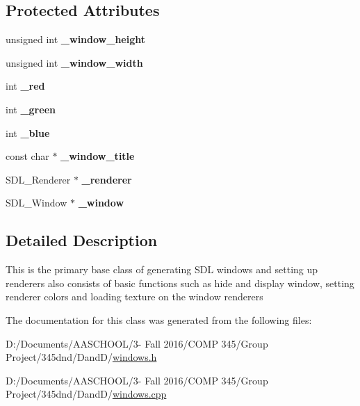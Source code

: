 \subsection*{Protected Attributes}
\begin{DoxyCompactItemize}
\item 
\hypertarget{class_s_d_l_window_acc157932676ffcb867e6a310d0dbf69b}{}\label{class_s_d_l_window_acc157932676ffcb867e6a310d0dbf69b} 
unsigned int {\bfseries \+\_\+window\+\_\+height}
\item 
\hypertarget{class_s_d_l_window_acd0639d5ba847c6fdffa9670678e0b4f}{}\label{class_s_d_l_window_acd0639d5ba847c6fdffa9670678e0b4f} 
unsigned int {\bfseries \+\_\+window\+\_\+width}
\item 
\hypertarget{class_s_d_l_window_a56b01157b3545f359a0beff63d5d404c}{}\label{class_s_d_l_window_a56b01157b3545f359a0beff63d5d404c} 
int {\bfseries \+\_\+red}
\item 
\hypertarget{class_s_d_l_window_a8290094b34e41442814cdde78f8be0d8}{}\label{class_s_d_l_window_a8290094b34e41442814cdde78f8be0d8} 
int {\bfseries \+\_\+green}
\item 
\hypertarget{class_s_d_l_window_a137c54559f64208948d607d915e3b3ef}{}\label{class_s_d_l_window_a137c54559f64208948d607d915e3b3ef} 
int {\bfseries \+\_\+blue}
\item 
\hypertarget{class_s_d_l_window_ad56f59226f814417588bd183b3d95ec7}{}\label{class_s_d_l_window_ad56f59226f814417588bd183b3d95ec7} 
const char $\ast$ {\bfseries \+\_\+window\+\_\+title}
\item 
\hypertarget{class_s_d_l_window_a5d019d10d5b118d1436601d28648395a}{}\label{class_s_d_l_window_a5d019d10d5b118d1436601d28648395a} 
S\+D\+L\+\_\+\+Renderer $\ast$ {\bfseries \+\_\+renderer}
\item 
\hypertarget{class_s_d_l_window_a9837fbcefc8e6fc41b11d44964c79cf2}{}\label{class_s_d_l_window_a9837fbcefc8e6fc41b11d44964c79cf2} 
S\+D\+L\+\_\+\+Window $\ast$ {\bfseries \+\_\+window}
\end{DoxyCompactItemize}


\subsection{Detailed Description}
This is the primary base class of generating S\+DL windows and setting up renderers also consists of basic functions such as hide and display window, setting renderer colors and loading texture on the window renderers 

The documentation for this class was generated from the following files\+:\begin{DoxyCompactItemize}
\item 
D\+:/\+Documents/\+A\+A\+S\+C\+H\+O\+O\+L/3-\/ Fall 2016/\+C\+O\+M\+P 345/\+Group Project/345dnd/\+Dand\+D/\hyperlink{windows_8h}{windows.\+h}\item 
D\+:/\+Documents/\+A\+A\+S\+C\+H\+O\+O\+L/3-\/ Fall 2016/\+C\+O\+M\+P 345/\+Group Project/345dnd/\+Dand\+D/\hyperlink{windows_8cpp}{windows.\+cpp}\end{DoxyCompactItemize}
